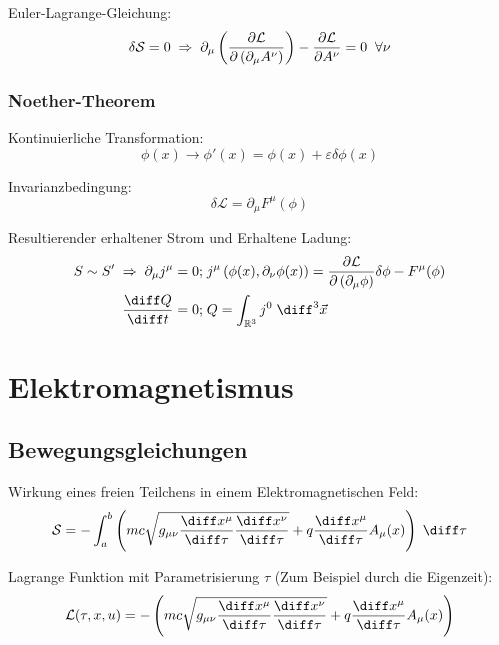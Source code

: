 \documentclass[11pt]{article}
\numberwithin{equation}{section}
\begin{document}
				\noindent
				Euler-Lagrange-Gleichung:
				\begin{equation}
					\delta\mathcal{S} = 0
					\;\Rightarrow\; \partial_\mu \left(\frac{\partial \mathcal{L}}{\partial \left(\partial_\mu A^\nu\right)}\right) - \frac{\partial \mathcal{L}}{\partial A^\nu} = 0 \;\;\forall \nu
				\end{equation}

			\subsubsection{Noether-Theorem}
				\noindent
				Kontinuierliche Transformation:
				\begin{equation}
					\phi(x)\rightarrow\phi'(x) = \phi(x) + \varepsilon \delta \phi(x)
				\end{equation}

				\noindent
				Invarianzbedingung:
				\begin{equation}
					\delta\mathcal{L} = \partial_\mu F^\mu(\phi)
				\end{equation}

				\noindent
				Resultierender erhaltener Strom und Erhaltene Ladung:
				\begin{equation}
					\begin{aligned}
						S \sim S' \;\Rightarrow\;\partial_\mu j^\mu = 0;&\; j^\mu \left( \phi(x), \partial_\nu\phi(x) \right) = \pder{\mathcal{L}}{\left(\partial_\mu \phi\right)}\delta\phi - F^\mu(\phi) \\
						\tder{Q}{t} = 0;&\; Q = \int_{\mathbb{R}^3} j^0\;\diff^3\vec{x}
					\end{aligned}
				\end{equation}


  \newpage
	\section{Elektromagnetismus}
		\subsection{Bewegungsgleichungen}
			\noindent
			Wirkung eines freien Teilchens in einem Elektromagnetischen Feld:
			\begin{equation}
				\mathcal{S}=-\int_{a}^{b}\left(mc\sqrt{g_{\mu\nu}\frac{\diff x^\mu}{\diff \tau}\frac{\diff x^\nu}{\diff \tau}}
		+ q\frac{\diff x^\mu}{\diff \tau}A_\mu(x)\right)\;\diff\tau
			\end{equation}

			\noindent
			Lagrange Funktion mit Parametrisierung $\tau$ (Zum Beispiel durch die Eigenzeit):
			\begin{equation}
				\mathcal{L} (\tau,x,u) =-\left(mc\sqrt{g_{\mu\nu}\frac{\diff x^\mu}{\diff \tau}\frac{\diff x^\nu}{\diff \tau}}
				+ q\frac{\diff x^\mu}{\diff \tau}A_\mu(x)\right)
			\end{equation}
\end{document}
